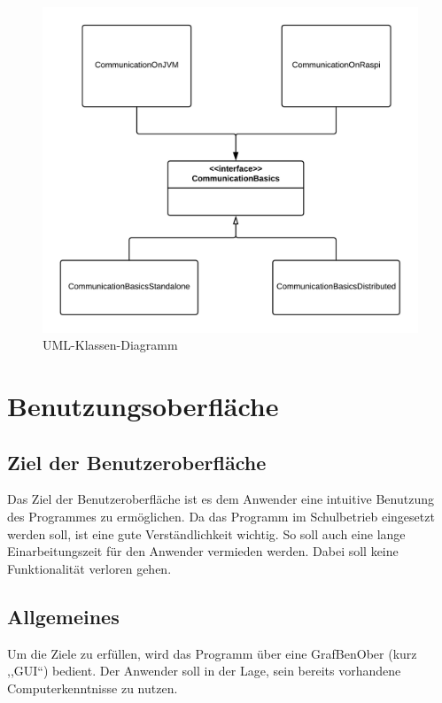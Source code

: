 \documentclass[parskip=full]{scrartcl}
\begin{document}
\begin{figure}[h]
	\begin{center}
		\includegraphics[width = 12cm]{Grafik/ClassDiagramForCommunication.png}
		\caption{UML-Klassen-Diagramm}
		\label{ClassDiagram}
	\end{center}
\end{figure}

\clearpage
\section{Benutzungsoberfläche}\label{gui}

\subsection{Ziel der Benutzeroberfläche}

Das Ziel der Benutzeroberfläche ist es dem Anwender eine intuitive Benutzung des Programmes zu ermöglichen. Da das Programm im Schulbetrieb eingesetzt werden soll, ist eine gute Verständlichkeit wichtig. So soll auch eine lange Einarbeitungszeit für den Anwender vermieden werden. Dabei soll keine Funktionalität verloren gehen.

\subsection{Allgemeines}

Um die Ziele zu erfüllen, wird das Programm über eine \gls{GrafBenOber} (kurz ,,GUI``) bedient. Der Anwender soll in der Lage, sein bereits vorhandene Computerkenntnisse zu nutzen.
\end{document}

